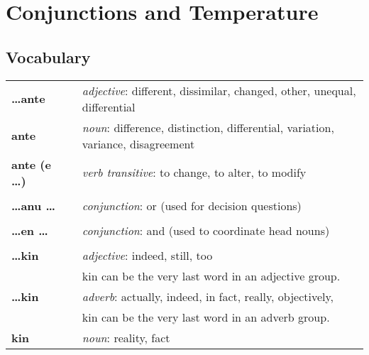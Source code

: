 
\section{Conjunctions and Temperature}
\subsection*{Vocabulary}

\begin{supertabular}{p{2,5cm}|ll}
    \textbf{\dots ante}       &  & \textit{adjective}: different, dissimilar, changed, other, unequal, differential            \\
    \textbf{ante}             &  & \textit{noun}: difference, distinction, differential, variation, variance, disagreement     \\
    \textbf{ante (e \dots)}   &  & \textit{verb transitive}: to change, to alter, to modify                                    \\
                              &  &                                                                                             \\
    \textbf{\dots anu \dots}  &  & \textit{conjunction}: or (used for decision questions)                                      \\
                              &  &                                                                                             \\
    \textbf{\dots en \dots}   &  & \textit{conjunction}: and (used to coordinate head nouns)                                   \\
                              &  &                                                                                             \\
    \textbf{\dots kin}        &  & \textit{adjective}: indeed, still, too                                                      \\ && kin can be the very last word in an adjective group. \\
    \textbf{\dots kin}        &  & \textit{adverb}: actually, indeed, in fact, really, objectively,                            \\ && kin can be the very last word in an adverb group. \\
    \textbf{kin}              &  & \textit{noun}: reality, fact                                                                \\

\end{supertabular}
